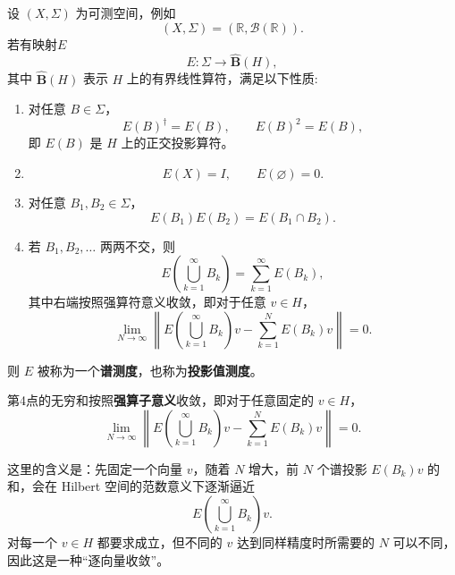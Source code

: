 \documentclass[UTF8,a4paper,11pt,openany]{ctexbook}
\begin{document}
\begin{definition}[投影值测度]
设 $(X,\Sigma)$ 为可测空间，例如
\[
(X,\Sigma)=(\mathbb R,\mathcal B(\mathbb R)).
\]
若有映射$E$
\[
E:\Sigma\to\hat{\textbf{B}}(H),
\]
其中 $\hat{\textbf{B}}(H)$ 表示 $H$ 上的有界线性算符，满足以下性质:

\begin{enumerate}
    \item 对任意 $B\in\Sigma$，
    \begin{equation}
        E(B)^\dagger=E(B),
        \qquad
        E(B)^2=E(B),
    \end{equation}
    即 $E(B)$ 是 $H$ 上的正交投影算符。

    \item
    \begin{equation}
        E(X)=I,
        \qquad
        E(\varnothing)=0.
    \end{equation}

    \item 对任意 $B_1,B_2\in\Sigma$，
    \begin{equation}
        E(B_1)E(B_2)
        =
        E(B_1\cap B_2).
    \end{equation}

    \item 若 $B_1,B_2,\ldots$ 两两不交，则
    \begin{equation}
        E\!\left(\bigcup_{k=1}^{\infty}B_k\right)
        =
        \sum_{k=1}^{\infty}E(B_k),
    \end{equation}
    其中右端按照强算符意义收敛，即对于任意 $v\in H$，
    \begin{equation}
        \lim_{N\to\infty}
        \left\|
        E\!\left(\bigcup_{k=1}^{\infty}B_k\right)v
        -
        \sum_{k=1}^{N}E(B_k)v
        \right\|
        =0.
    \end{equation}
\end{enumerate}

则 $E$ 被称为一个\textbf{谱测度}，也称为\textbf{投影值测度}。
\end{definition}

第4点的无穷和按照\textbf{强算子意义}收敛，即对于任意固定的
$v\in H$，
\begin{equation}
    \lim_{N\to\infty}
    \left\|
    E\!\left(\bigcup_{k=1}^{\infty}B_k\right)v
    -
    \sum_{k=1}^{N}E(B_k)v
    \right\|
    =0.
\end{equation}

这里的含义是：先固定一个向量 $v$，随着 $N$ 增大，前 $N$ 个谱投影
$E(B_k)v$ 的和，会在 Hilbert 空间的范数意义下逐渐逼近
\[
E\!\left(\bigcup_{k=1}^{\infty}B_k\right)v.
\]
对每一个 $v\in H$ 都要求成立，但不同的 $v$ 达到同样精度时所需要的
$N$ 可以不同，因此这是一种“逐向量收敛”。
\end{document}
